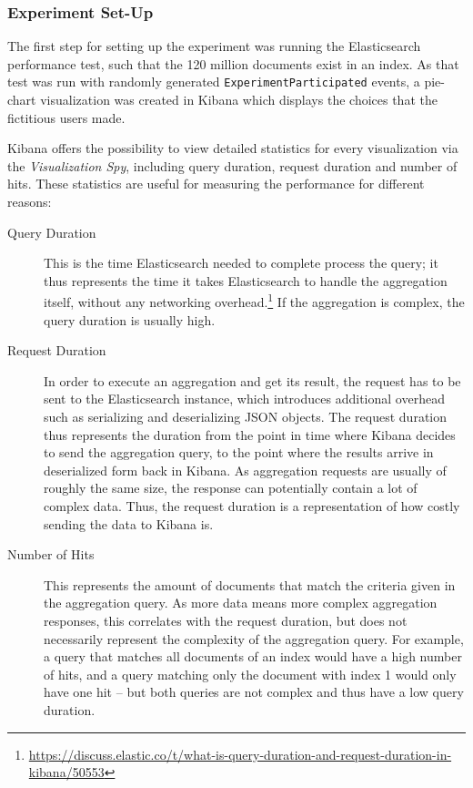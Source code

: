 \subsubsection{Experiment Set-Up}

The first step for setting up the experiment was running the Elasticsearch performance test, such that the 120 million documents exist in an index.
As that test was run with randomly generated \texttt{ExperimentParticipated} events, a pie-chart visualization was created in Kibana which displays the choices that the fictitious users made.

Kibana offers the possibility to view detailed statistics for every visualization via the \emph{Visualization Spy}, including query duration, request duration and number of hits.
These statistics are useful for measuring the performance for different reasons:

\begin{description}
\item[Query Duration] This is the time Elasticsearch needed to complete process the query; it thus represents the time it takes Elasticsearch to handle the aggregation itself, without any networking overhead.\footnote{\url{https://discuss.elastic.co/t/what-is-query-duration-and-request-duration-in-kibana/50553}}
If the aggregation is complex, the query duration is usually high.
\item[Request Duration] In order to execute an aggregation and get its result, the request has to be sent to the Elasticsearch instance, which introduces additional overhead such as serializing and deserializing \ac{JSON} objects.
The request duration thus represents the duration from the point in time where Kibana decides to send the aggregation query, to the point where the results arrive in deserialized form back in Kibana.
As aggregation requests are usually of roughly the same size, the response can potentially contain a lot of complex data.
Thus, the request duration is a representation of how costly sending the data to Kibana is.
\item[Number of Hits] This represents the amount of documents that match the criteria given in the aggregation query.
As more data means more complex aggregation responses, this correlates with the request duration, but does not necessarily represent the complexity of the aggregation query.
For example, a query that matches all documents of an index would have a high number of hits, and a query matching only the document with index 1 would only have one hit -- but both queries are not complex and thus have a low query duration.
\end{description}

